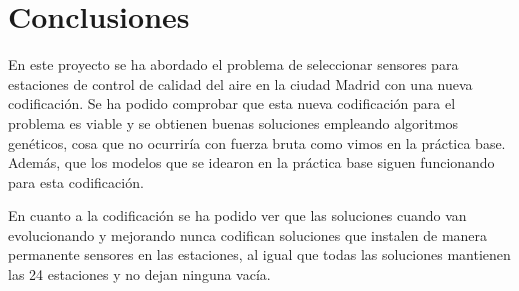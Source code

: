 \documentclass[12pt, spanish, pdftex]{UC3M_document}
\begin{document}
\section{Conclusiones}
En este proyecto se ha abordado el problema de seleccionar sensores para estaciones de control de calidad del aire en la ciudad Madrid con una nueva codificación. Se ha podido comprobar que esta nueva codificación para el problema es viable y se obtienen buenas soluciones empleando algoritmos genéticos, cosa que no ocurriría con fuerza bruta como vimos en la práctica base. Además, que los modelos que se idearon en la práctica base siguen funcionando para esta codificación.

En cuanto a la codificación se ha podido ver que las soluciones cuando van evolucionando y mejorando nunca codifican soluciones que instalen de manera permanente sensores en las estaciones, al igual que todas las soluciones mantienen las 24 estaciones y no dejan ninguna vacía.
\end{document}
